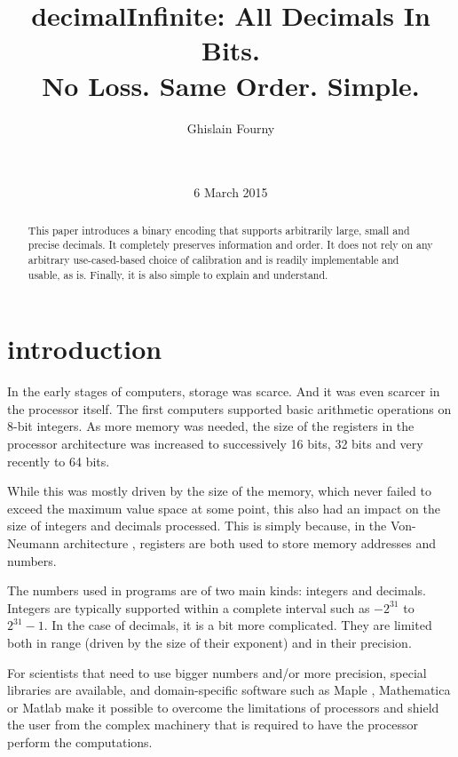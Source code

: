 \documentclass{acm_proc_article-sp}
\begin{document}
\title{decimalInfinite: All Decimals In Bits.\\ No Loss. Same Order. Simple.}


\author{
\alignauthor
Ghislain Fourny\\
       \\
       \\
}
\date{6 March 2015}
\maketitle

\begin{abstract}
This paper introduces a binary encoding that supports arbitrarily large, small and precise decimals. It completely preserves information and order. It does not rely on any arbitrary use-cased-based choice of calibration and is readily implementable and usable, as is. Finally, it is also simple to explain and understand.
\end{abstract}

\section{introduction}
In the early stages of computers, storage was scarce. And it was even scarcer in the processor itself. The first computers supported basic arithmetic operations on 8-bit integers. As more memory was needed, the size of the registers in the processor architecture was increased to successively 16 bits, 32 bits and very recently to 64 bits.

While this was mostly driven by the size of the memory, which never failed to exceed the maximum value space at some point, this also had an impact on the size of integers and decimals processed. This is simply because, in the Von-Neumann architecture \cite{VonNeumann1946}, registers are both used to store memory addresses and numbers.

The numbers used in programs are of two main kinds: integers and decimals. Integers are typically supported within a complete interval such as $- 2^{31}$ to $2^{31} -1$. In the case of decimals, it is a bit more complicated. They are limited both in range (driven by the size of their exponent) and in their precision.

For scientists that need to use bigger numbers and/or more precision, special libraries are available, and domain-specific software such as Maple \cite{MAPLE}, Mathematica \cite{MATHEMATICA} or Matlab \cite{MATLAB} make it possible to overcome the limitations of processors and shield the user from the complex machinery that is required to have the processor perform the computations.
\end{document}
